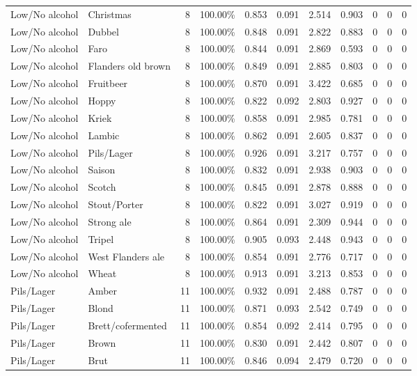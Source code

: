 {\begin{longtable}{llrrrrrrrrr}
Low/No alcohol & Christmas & 8 & 100.00\% & 0.853 & 0.091 & 2.514 & 0.903 & 0 & 0 & 0 \\
Low/No alcohol & Dubbel & 8 & 100.00\% & 0.848 & 0.091 & 2.822 & 0.883 & 0 & 0 & 0 \\
Low/No alcohol & Faro & 8 & 100.00\% & 0.844 & 0.091 & 2.869 & 0.593 & 0 & 0 & 0 \\
Low/No alcohol & Flanders old brown & 8 & 100.00\% & 0.849 & 0.091 & 2.885 & 0.803 & 0 & 0 & 0 \\
Low/No alcohol & Fruitbeer & 8 & 100.00\% & 0.870 & 0.091 & 3.422 & 0.685 & 0 & 0 & 0 \\
Low/No alcohol & Hoppy & 8 & 100.00\% & 0.822 & 0.092 & 2.803 & 0.927 & 0 & 0 & 0 \\
Low/No alcohol & Kriek & 8 & 100.00\% & 0.858 & 0.091 & 2.985 & 0.781 & 0 & 0 & 0 \\
Low/No alcohol & Lambic & 8 & 100.00\% & 0.862 & 0.091 & 2.605 & 0.837 & 0 & 0 & 0 \\
Low/No alcohol & Pils/Lager & 8 & 100.00\% & 0.926 & 0.091 & 3.217 & 0.757 & 0 & 0 & 0 \\
Low/No alcohol & Saison & 8 & 100.00\% & 0.832 & 0.091 & 2.938 & 0.903 & 0 & 0 & 0 \\
Low/No alcohol & Scotch & 8 & 100.00\% & 0.845 & 0.091 & 2.878 & 0.888 & 0 & 0 & 0 \\
Low/No alcohol & Stout/Porter & 8 & 100.00\% & 0.822 & 0.091 & 3.027 & 0.919 & 0 & 0 & 0 \\
Low/No alcohol & Strong ale & 8 & 100.00\% & 0.864 & 0.091 & 2.309 & 0.944 & 0 & 0 & 0 \\
Low/No alcohol & Tripel & 8 & 100.00\% & 0.905 & 0.093 & 2.448 & 0.943 & 0 & 0 & 0 \\
Low/No alcohol & West Flanders ale & 8 & 100.00\% & 0.854 & 0.091 & 2.776 & 0.717 & 0 & 0 & 0 \\
Low/No alcohol & Wheat & 8 & 100.00\% & 0.913 & 0.091 & 3.213 & 0.853 & 0 & 0 & 0 \\
Pils/Lager & Amber & 11 & 100.00\% & 0.932 & 0.091 & 2.488 & 0.787 & 0 & 0 & 0 \\
Pils/Lager & Blond & 11 & 100.00\% & 0.871 & 0.093 & 2.542 & 0.749 & 0 & 0 & 0 \\
Pils/Lager & Brett/cofermented & 11 & 100.00\% & 0.854 & 0.092 & 2.414 & 0.795 & 0 & 0 & 0 \\
Pils/Lager & Brown & 11 & 100.00\% & 0.830 & 0.091 & 2.442 & 0.807 & 0 & 0 & 0 \\
Pils/Lager & Brut & 11 & 100.00\% & 0.846 & 0.094 & 2.479 & 0.720 & 0 & 0 & 0 \\

\end{longtable}}
